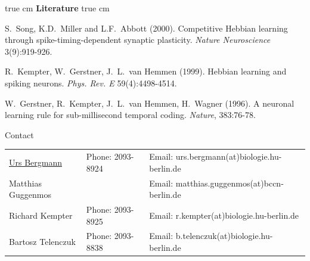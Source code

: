 \documentclass[12pt]{article}
\begin{document}
 true cm
{\bf Literature}
 true cm

S.~Song, K.D.~Miller and L.F.~Abbott (2000). Competitive Hebbian learning
through spike-timing-dependent synaptic plasticity.
\emph{Nature Neuroscience} 3(9):919-926.\newline

R.~Kempter, W.~Gerstner, J.~L.~van Hemmen (1999). Hebbian learning and spiking
neurons. \emph{Phys. Rev. E} 59(4):4498-4514.\newline

W.~Gerstner, R.~Kempter, J.~L.~van Hemmen, H.~Wagner (1996). A neuronal
learning rule for sub-millisecond temporal coding. \emph{Nature},
383:76-78.\newline

\vfill
\centerline{\CAP Contact}
\CAP

\begin{tabular}{lll}
\underline{Urs Bergmann} & Phone: 2093-8924 & Email:
urs.bergmann(at)biologie.hu-berlin.de \\
Matthias Guggenmos & & Email: matthias.guggenmos(at)bccn-berlin.de \\
Richard Kempter \hfill & Phone: 2093-8925 \hfill & Email:
r.kempter(at)biologie.hu-berlin.de \\
Bartosz Telenczuk & Phone: 2093-8838 & Email:
b.telenczuk(at)biologie.hu-berlin.de \\
\end{tabular}
\end{document}
